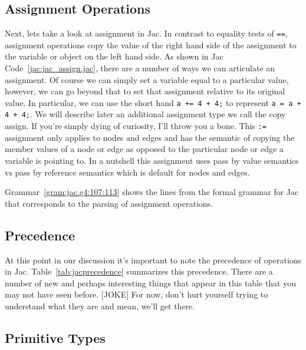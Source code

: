 \subsection{Assignment Operations}
Next, lets take a look at assignment in Jac. In contrast to equality tests of \texttt{==}, assignment operations copy the value of the right hand side of the assignment to the variable or object on the left hand side.
As shown in Jac Code~\ref{jac:jac_assign.jac}, there are a number of ways we can articulate an assignment. Of course we can simply set a variable equal to a particular value, however, we can go beyond that to set that assignment relative to its original value. In particular, we can use the short hand \texttt{a += 4 + 4;} to represent \texttt{a = a + 4 + 4;}. We will describe later an additional assignment type we call the copy assign. If you're simply dying of curiosity, I'll throw you a bone. This \texttt{:=} assignment only applies to nodes and edges and has the semantic of copying the member values of a node or edge as opposed to the particular node or edge a variable is pointing to. In a nutshell this assignment uses pass by value semantics vs pass by reference semantics which is default for nodes and edges.

\begin{nerd}
    Grammar~\ref{gram:jac.g4:107:113} shows the lines from the formal grammar for Jac that corresponds to the parsing of assignment operations.
\end{nerd}



\subsection{Precedence}
\printtabPrecedence
At this point in our discussion it's important to note the precedence of operations in Jac. Table~\ref{tab:jacprecedence} summarizes this precedence. There are a number of new and perhaps interesting things that appear in this table that you may not have seen before. [JOKE] For now, don't hurt yourself trying to understand what they are and mean, we'll get there.

\subsection{Primitive Types}

